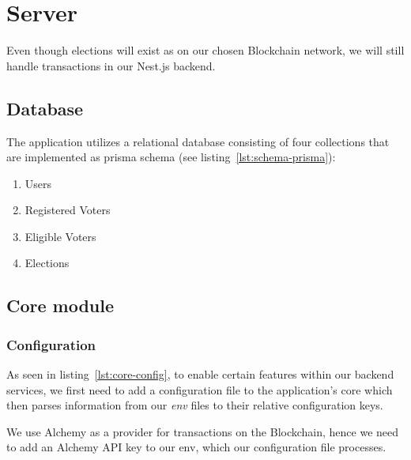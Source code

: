 
\section{Server}\label{sec:server}

Even though elections will exist as  on our chosen \gls{Blockchain} network, we will still handle transactions in our Nest.js backend.

\subsection{Database}\label{subsec:database}


The application utilizes a relational database consisting of four collections that are implemented as prisma schema (see listing~\ref{lst:schema-prisma}):

\begin{enumerate}
    \item Users
    \item Registered Voters
    \item Eligible Voters
    \item Elections
\end{enumerate}

\subsection{Core module}\label{subsec:core-module}

\subsubsection{Configuration}

As seen in listing~\ref{lst:core-config}, to enable certain features within our backend services, we first need to add a configuration file to the application's core which then parses information from our \emph{env} files to their relative configuration keys.


We use Alchemy as a provider for transactions on the \gls{Blockchain}, hence we need to add an Alchemy \gls{API} key to our env, which our configuration file processes.

